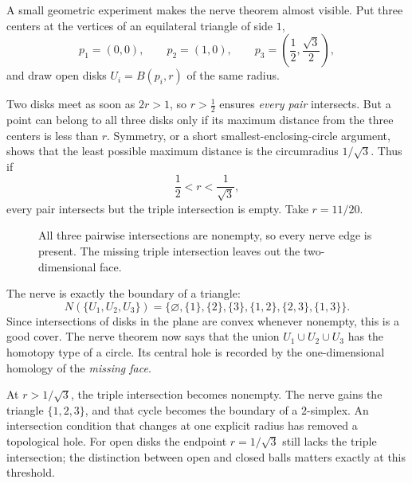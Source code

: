 A small geometric experiment makes the nerve theorem almost visible. Put three centers at the vertices of an equilateral triangle of side $1$,
\[
 p_1=(0,0),\qquad p_2=(1,0),\qquad
 p_3=\left(\frac12,\frac{\sqrt3}{2}\right),
\]
and draw open disks $U_i=B(p_i,r)$ of the same radius.

Two disks meet as soon as $2r>1$, so $r>\frac12$ ensures \emph{every pair} intersects. But a point can belong to all three disks only if its maximum distance from the three centers is less than $r$. Symmetry, or a short smallest-enclosing-circle argument, shows that the least possible maximum distance is the circumradius $1/\sqrt3$. Thus if
\[
 \boxed{\frac12<r<\frac1{\sqrt3},}
\]
every pair intersects but the triple intersection is empty. Take $r=11/20$.

\begin{figure}[H]
\centering
{}
\caption{All three pairwise intersections are nonempty, so every nerve edge is present. The missing triple intersection leaves out the two-dimensional face.}
\end{figure}

The nerve is exactly the boundary of a triangle:
\[
 N(\{U_1,U_2,U_3\})=
 \{\varnothing,\{1\},\{2\},\{3\},
   \{1,2\},\{2,3\},\{1,3\}\}.
\]
Since intersections of disks in the plane are convex whenever nonempty, this is a good cover. The nerve theorem now says that the union $U_1\cup U_2\cup U_3$ has the homotopy type of a circle. Its central hole is recorded by the one-dimensional homology of the \emph{missing face}.

At $r>1/\sqrt3$, the triple intersection becomes nonempty. The nerve gains the triangle $\{1,2,3\}$, and that cycle becomes the boundary of a $2$-simplex. An intersection condition that changes at one explicit radius has removed a topological hole. For open disks the endpoint $r=1/\sqrt3$ still lacks the triple intersection; the distinction between open and closed balls matters exactly at this threshold.
